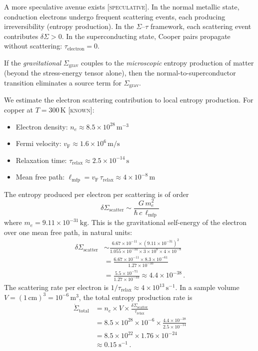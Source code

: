 \documentclass[prd,twocolumn,superscriptaddress,longbibliography,floatfix]{revtex4-2}
\newcommand{\tauasym}{\tau}
\newcommand{\Sgrav}{\Sigma_{\mathrm{grav}}}
\newcommand{\vF}{v_{\mathrm{F}}}
\newcommand{\trel}{\tau_{\mathrm{relax}}}
\newcommand{\known}{\textsc{[known]}}
\newcommand{\specmark}{\textsc{[speculative]}}
\begin{document}
A more speculative avenue exists \specmark.  In the normal metallic
state, conduction electrons undergo frequent scattering events, each
producing irreversibility (entropy production).  In the
$\Sigma$--$\tauasym$ framework, each scattering event contributes
$\delta\Sigma > 0$.  In the superconducting state, Cooper pairs
propagate without scattering: $\tauasym_{\mathrm{electron}} = 0$.

If the \emph{gravitational} $\Sgrav$ couples to the
\emph{microscopic} entropy production of matter (beyond the
stress-energy tensor alone), then the normal-to-superconductor
transition eliminates a source term for $\Sgrav$.

We estimate the electron scattering contribution to
local entropy production.  For copper at $T = 300\,\mathrm{K}$
\known:
\begin{itemize}
  \item Electron density: $n_e \approx 8.5 \times 10^{28}\,\mathrm{m^{-3}}$
  \item Fermi velocity: $\vF \approx 1.6 \times 10^6\,\mathrm{m/s}$
  \item Relaxation time: $\trel \approx 2.5 \times 10^{-14}\,\mathrm{s}$
  \item Mean free path: $\ell_{\mathrm{mfp}} = \vF\,\trel
    \approx 4 \times 10^{-8}\,\mathrm{m}$
\end{itemize}
The entropy produced per electron per scattering is of order
\begin{equation}
  \delta\Sigma_{\mathrm{scatter}} \sim \frac{G\,m_e^2}{\hbar\,c\,
  \ell_{\mathrm{mfp}}}
  \label{eq:sigma-scatter}
\end{equation}
where $m_e = 9.11 \times 10^{-31}\,\mathrm{kg}$.  This is the
gravitational self-energy of the electron over one mean free path,
in natural units:
\begin{align}
  \delta\Sigma_{\mathrm{scatter}} &\sim
  \frac{6.67 \times 10^{-11} \times (9.11 \times 10^{-31})^2}
  {1.055 \times 10^{-34} \times 3 \times 10^8 \times 4 \times 10^{-8}}
  \nonumber \\
  &= \frac{6.67 \times 10^{-11} \times 8.3 \times 10^{-61}}
  {1.27 \times 10^{-33}}
  \nonumber \\
  &= \frac{5.5 \times 10^{-71}}{1.27 \times 10^{-33}}
  \approx 4.4 \times 10^{-38}\,.
  \label{eq:sigma-scatter-num}
\end{align}
The scattering rate per electron is $1/\trel \approx 4 \times 10^{13}\,
\mathrm{s^{-1}}$.  In a sample volume $V = (1\,\mathrm{cm})^3 = 10^{-6}\,
\mathrm{m^3}$, the total entropy production rate is
\begin{align}
  \dot{\Sigma}_{\mathrm{total}} &= n_e \times V \times
  \frac{\delta\Sigma_{\mathrm{scatter}}}{\trel}
  \nonumber \\
  &= 8.5 \times 10^{28} \times 10^{-6} \times
  \frac{4.4 \times 10^{-38}}{2.5 \times 10^{-14}}
  \nonumber \\
  &= 8.5 \times 10^{22} \times 1.76 \times 10^{-24}
  \nonumber \\
  &\approx 0.15\;\mathrm{s^{-1}}\,.
  \label{eq:sigma-dot}
\end{align}
\end{document}
